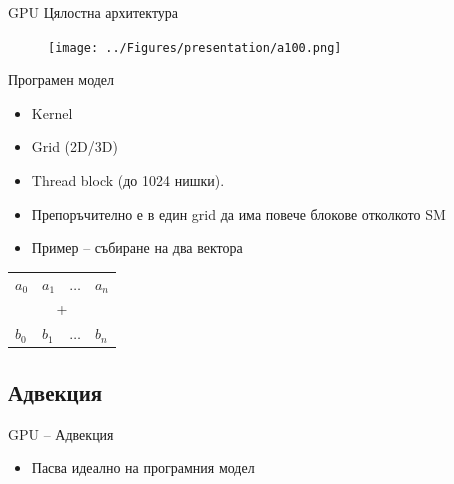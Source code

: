 \documentclass{beamer}
\begin{document}
\begin{frame}{GPU Цялостна архитектура}
   \begin{figure}[H]
  \centering
  \texttt{[image: ../Figures/presentation/а100.png]}
\end{figure}
\end{frame}
\begin{frame}{Програмен модел}
	\begin{itemize}
		\item Kernel
		\item Grid (2D/3D)
		\item Thread block (до 1024 нишки).
		\item Препоръчително е в един grid да има повече блокове отколкото SM
		\item Пример -- събиране на два вектора
	\end{itemize}
	\begin{table}[]
\begin{tabular}{llll}
$a_0$ & $a_1$ & $\dots$ & $a_n$ \\
\multicolumn{4}{c}{+} \\
$b_0$ & $b_1$ & $\dots$ & $b_n$
\end{tabular}
\end{table}
\end{frame}

\subsection{Адвекция}
\begin{frame}{GPU -- Адвекция}
	\begin{itemize}
		\item Пасва идеално на програмния модел
	\end{itemize}
\end{frame}
\end{document}
